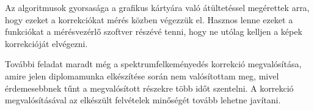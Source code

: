 \documentclass[a4paper,12pt]{article}
\begin{document}
Az algoritmusok gyorsasága a grafikus kártyára való átültetéssel megérettek arra, hogy ezeket a korrekciókat mérés közben végezzük el. Hasznos lenne ezeket a funkciókat a mérésvezérlő szoftver részévé tenni, hogy ne utólag kelljen a képek korrekcióját elvégezni.

További feladat maradt még a spektrumfelkeményedés korrekció megvalósítása, amire jelen diplomamunka elkészítése során nem valósítottam meg, mivel érdemesebbnek tűnt a megvalósított részekre több időt szentelni. A korrekció megvalósításával az elkészült felvételek minőségét tovább lehetne javítani. 




%
%
%




\clearpage



 
\end{document}
